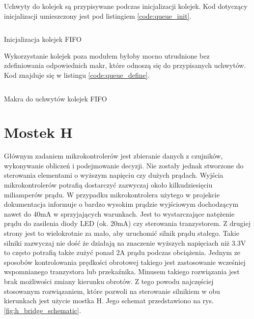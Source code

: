             Uchwyty do kolejek są przypisywane podczas inicjalizacji kolejek. Kod dotyczący inicjalizacji umieszczony jest pod listingiem \ref{code:queue_init}.
            
             \begin{kod}
              \inputminted[firstline=235, lastline=242]{cpp}{esp/listings/task_mngm.cpp}
              \caption{Inicjalizacja kolejek FIFO}
              \label{code:queue_init}
              \vspace{2em}
            \end{kod}          
            
            Wykorzystanie kolejek poza modułem byłoby mocno utrudnione bez zdefiniowania odpowiednich makr, które odnoszą się do przypisanych uchwytów. Kod znajduje się w listingu \ref{code:queue_define}.
            
             \begin{kod}
              \inputminted[firstline=63, lastline=71]{cpp}{esp/listings/task_mngm.hpp}
              \caption{Makra do uchwytów kolejek FIFO}
              \label{code:queue_define}
              \vspace{2em}
            \end{kod} 
            
            
        \section{Mostek H}
            Głównym zadaniem mikrokontrolerów jest zbieranie danych z czujników, wykonywanie obliczeń i podejmowanie decyzji. Nie zostały jednak stworzone do sterowania elementami o wyższym napięciu czy dużych prądach. Wyjścia mikrokontrolerów potrafią dostarczyć zazwyczaj około kilkudziesięciu miliamperów prądu. W przypadku mikrokontrolera użytego w projekcie dokumentacja \cite{esp32} informuje o bardzo wysokim prądzie wyjściowym dochodzącym nawet do 40mA w sprzyjających warunkach. Jest to wystarczające natężenie prądu do zasilenia diody LED (ok. 20mA) czy sterowania tranzystorem. Z drugiej strony jest to wielokrotnie za mało, aby uruchomić silnik prądu stałego. Takie silniki zazwyczaj nie dość że działają na znaczenie wyższych napięciach niż 3.3V to często potrafią także zużyć ponad 2A prądu podczas obciążenia. Jednym ze sposobów kontrolowania prędkości obrotowej takiego jest zastosowanie wcześniej wspomnianego tranzystora lub przekaźnika. Minusem takiego rozwiązania jest brak możliwości zmiany kierunku obrotów. Z tego powodu najczęściej stosowanym rozwiązaniem, które pozwoli na sterowanie silnikiem w obu kierunkach jest użycie mostka H. Jego schemat przedstawiono na rys. \ref{fig:h_bridge_schematic}.
            
